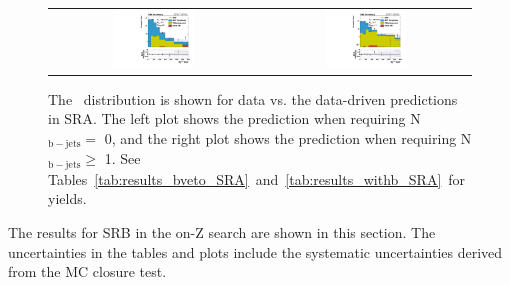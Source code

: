 \begin{figure}[!ht]
\begin{center}
\begin{tabular}{cc}
\includegraphics[width=0.4\textwidth]{results/figs/h_met_rawgt1jet_ll_signalregion_rawMET_loosephoton_bveto_SRA_fsbkg_passtrig.pdf} &
\includegraphics[width=0.4\textwidth]{results/figs/h_met_rawgt1jet_ll_signalregion_rawMET_loosephoton_withb_SRA_fsbkg_passtrig.pdf} \\
\end{tabular}
\caption{The \MET\ distribution is shown for data vs. the data-driven predictions in SRA.
The left plot shows the prediction when requiring N$\mathrm{_{b-jets}} =$ 0, and the right plot shows the prediction when requiring N$\mathrm{_{b-jets}} \geq$ 1.
See Tables~\ref{tab:results_bveto_SRA}~and~\ref{tab:results_withb_SRA}~for yields.
\label{fig:results_SRA}
}
\end{center}
\end{figure}

\clearpage


The results for SRB in the on-Z search are shown in this section.
The uncertainties in the tables and plots include the systematic uncertainties derived from the MC closure test.

